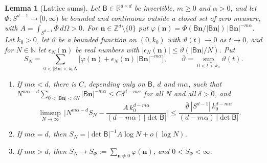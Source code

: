 \documentclass[aps,prb,10pt,onecolumn,amsmath,amssymb,superscriptaddress,nofootinbib]{revtex4-2}
\theoremstyle{plain}
\newtheorem{lemma}{Lemma}
\begin{document}
\begin{lemma}[Lattice sums]\label{lem:lattice}
Let $\mathsf B\in\mathbb R^{d\times d}$ be invertible, $m\ge0$ and $\alpha>0$, and let
$\Phi\colon S^{d-1}\to[0,\infty)$ be bounded and continuous outside a closed set of zero measure, with
$A=\int_{S^{d-1}}\Phi\,d\Omega>0$. For $\mathbf n\in\mathbb Z^d\setminus\{0\}$ put
$\varphi(\mathbf n)=\Phi(\mathsf B\mathbf n/|\mathsf B\mathbf n|)\,|\mathsf B\mathbf n|^{-m\alpha}$. Let $k_0>0$,
let $\vartheta$ be a bounded function on $(0,k_0)$ with $\vartheta(t)\to0$ as $t\to0$, and for
$N\in\mathbb N$ let $\epsilon_N(\mathbf n)$ be real numbers with
$|\epsilon_N(\mathbf n)|\le\vartheta(|\mathsf B\mathbf n|/N)$. Put
\begin{equation}
S_N=\sum_{0<|\mathsf B\mathbf n|<k_0N}\big[\varphi(\mathbf n)+\epsilon_N(\mathbf n)\,|\mathsf B\mathbf n|^{-m\alpha}\big],
\qquad\bar\vartheta=\sup_{0<t<k_0}\vartheta(t).
\label{eq:SN}
\end{equation}
\begin{enumerate}
\item[(a)] If $m\alpha<d$, there is $C$, depending only on $\mathsf B$, $d$ and $m\alpha$, such that
$N^{m\alpha-d}\sum_{0<|\mathsf B\mathbf n|<\delta N}|\mathsf B\mathbf n|^{-m\alpha}\le C\delta^{d-m\alpha}$ for
all $N$ and all $\delta>0$, and
\begin{equation}
\limsup_{N\to\infty}\,\Big|N^{m\alpha-d}S_N-\frac{A\,k_0^{d-m\alpha}}{(d-m\alpha)\,|\det\mathsf B|}\Big|
\le\frac{\bar\vartheta\,|S^{d-1}|\,k_0^{d-m\alpha}}{(d-m\alpha)\,|\det\mathsf B|}.
\label{eq:Sa}
\end{equation}
\item[(b)] If $m\alpha=d$, then $S_N=|\det\mathsf B|^{-1}A\log N+o(\log N)$.
\item[(c)] If $m\alpha>d$, then $S_N\to S_\Phi:=\sum_{\mathbf n\ne0}\varphi(\mathbf n)$, and $0<S_\Phi<\infty$.
\end{enumerate}
\end{lemma}
\end{document}
